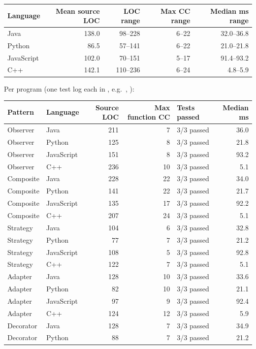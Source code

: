 \documentclass[11pt,a4paper]{article}
\begin{document}
\begin{tabular}{@{}lrrrr@{}}\toprule
Language & Mean source LOC & LOC range & Max CC range & Median ms range\\\midrule
Java & 138.0 & 98--228 & 6--22 & 32.0--36.8\\
Python & 86.5 & 57--141 & 6--22 & 21.0--21.8\\
JavaScript & 102.0 & 70--151 & 5--17 & 91.4--93.2\\
C++ & 142.1 & 110--236 & 6--24 & 4.8--5.9\\
\bottomrule\end{tabular}

Per program (one test log each in , e.g.\ , ):

\begin{longtable}{@{}llrrlr@{}}\toprule
Pattern & Language & Source LOC & Max function CC & Tests passed & Median ms\\\midrule\endhead
Observer & Java & 211 & 7 & 3/3 passed & 36.0\\
Observer & Python & 125 & 8 & 3/3 passed & 21.8\\
Observer & JavaScript & 151 & 8 & 3/3 passed & 93.2\\
Observer & C++ & 236 & 10 & 3/3 passed & 5.1\\
Composite & Java & 228 & 22 & 3/3 passed & 34.0\\
Composite & Python & 141 & 22 & 3/3 passed & 21.7\\
Composite & JavaScript & 135 & 17 & 3/3 passed & 92.2\\
Composite & C++ & 207 & 24 & 3/3 passed & 5.1\\
Strategy & Java & 104 & 6 & 3/3 passed & 32.8\\
Strategy & Python & 77 & 7 & 3/3 passed & 21.2\\
Strategy & JavaScript & 108 & 5 & 3/3 passed & 92.8\\
Strategy & C++ & 122 & 7 & 3/3 passed & 5.1\\
Adapter & Java & 128 & 10 & 3/3 passed & 33.6\\
Adapter & Python & 82 & 10 & 3/3 passed & 21.1\\
Adapter & JavaScript & 97 & 9 & 3/3 passed & 92.4\\
Adapter & C++ & 124 & 12 & 3/3 passed & 5.9\\
Decorator & Java & 128 & 7 & 3/3 passed & 34.9\\
Decorator & Python & 88 & 7 & 3/3 passed & 21.2\\

\end{longtable}
\end{document}
